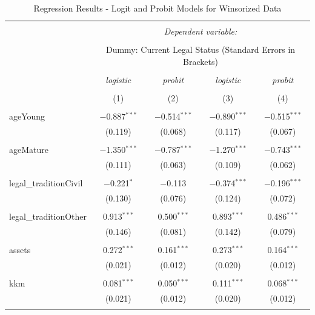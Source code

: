 \documentclass[a4paper,nobind]{templates/ociamthesis}
\begin{document}
\begin{table}[!htbp] \centering 
  \caption{Regression Results - Logit and Probit Models for Winsorized Data} 
  \label{} 
\footnotesize 
\begin{tabular}{@{\extracolsep{5pt}}lcccc} 
\\[-1.8ex]\hline 
\hline \\[-1.8ex] 
 & \multicolumn{4}{c}{\textit{Dependent variable:}} \\ 
\cline{2-5} 
\\[-1.8ex] & \multicolumn{4}{c}{Dummy: Current Legal Status (Standard Errors in Brackets)} \\ 
\\[-1.8ex] & \textit{logistic} & \textit{probit} & \textit{logistic} & \textit{probit} \\ 
\\[-1.8ex] & (1) & (2) & (3) & (4)\\ 
\hline \\[-1.8ex] 
 ageYoung & $-$0.887$^{***}$ & $-$0.514$^{***}$ & $-$0.890$^{***}$ & $-$0.515$^{***}$ \\ 
  & (0.119) & (0.068) & (0.117) & (0.067) \\ 
  & & & & \\ 
 ageMature & $-$1.350$^{***}$ & $-$0.787$^{***}$ & $-$1.270$^{***}$ & $-$0.743$^{***}$ \\ 
  & (0.111) & (0.063) & (0.109) & (0.062) \\ 
  & & & & \\ 
 legal\_traditionCivil & $-$0.221$^{*}$ & $-$0.113 & $-$0.374$^{***}$ & $-$0.196$^{***}$ \\ 
  & (0.130) & (0.076) & (0.124) & (0.072) \\ 
  & & & & \\ 
 legal\_traditionOther & 0.913$^{***}$ & 0.500$^{***}$ & 0.893$^{***}$ & 0.486$^{***}$ \\ 
  & (0.146) & (0.081) & (0.142) & (0.079) \\ 
  & & & & \\ 
 assets & 0.272$^{***}$ & 0.161$^{***}$ & 0.273$^{***}$ & 0.164$^{***}$ \\ 
  & (0.021) & (0.012) & (0.020) & (0.012) \\ 
  & & & & \\ 
 kkm & 0.081$^{***}$ & 0.050$^{***}$ & 0.111$^{***}$ & 0.068$^{***}$ \\ 
  & (0.021) & (0.012) & (0.020) & (0.012) \\ 
  & & & & \\ 

\end{tabular}
\end{table}
\end{document}
